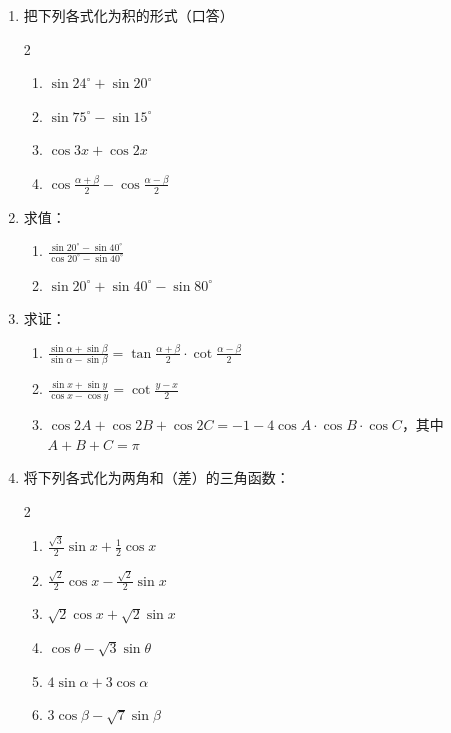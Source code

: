 \begin{ex}
\begin{enumerate}
    \item 把下列各式化为积的形式（口答）
\begin{multicols}{2}
\begin{enumerate}
    \item $\sin 24^{\circ}+\sin 20^{\circ}$
    \item $\sin 75^{\circ}-\sin 15^{\circ}$
    \item $\cos 3x+\cos 2x$
    \item $\cos\frac{\alpha+\beta}{2}-\cos\frac{\alpha-\beta}{2}$
\end{enumerate}
\end{multicols}

\item 求值：
\begin{enumerate}
    \item $\frac{\sin20^{\circ}-\sin 40^{\circ}}{\cos 20^{\circ}-\sin 40^{\circ}}$
    \item $\sin 20^{\circ}+\sin 40^{\circ}-\sin 80^{\circ}$
\end{enumerate}

\item 求证：
\begin{enumerate}
    \item $\frac{\sin\alpha+\sin\beta}{\sin\alpha-\sin\beta}=\tan\frac{\alpha+\beta}{2}\cdot \cot\frac{\alpha-\beta}{2}$
    \item $\frac{\sin x+\sin y}{\cos x-\cos y}=\cot\frac{y-x}{2}$
    \item $\cos 2A+\cos 2B+\cos 2C=-1-4\cos A\cdot \cos B\cdot \cos C$，其中$A+B+C=\pi$
\end{enumerate}

\item 将下列各式化为两角和（差）的三角函数：
\begin{multicols}{2}
\begin{enumerate}
    \item $\frac{\sqrt{3}}{2}\sin x+\frac{1}{2}\cos x$
    \item $\frac{\sqrt{2}}{2}\cos x-\frac{\sqrt{2}}{2}\sin x$
    \item $\sqrt{2}\cos x+\sqrt{2}\sin x$
    \item $\cos\theta-\sqrt{3}\sin\theta$
    \item $4\sin\alpha+3\cos\alpha$
    \item $3\cos\beta-\sqrt{7}\sin\beta$
\end{enumerate}
\end{multicols}
\end{enumerate}
\end{ex}


